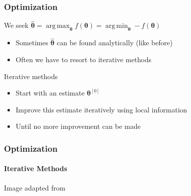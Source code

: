 \documentclass[xetex,professionalfont]{beamer}
\DeclareMathOperator*{\argmin}{arg\,min}
\DeclareMathOperator*{\argmax}{arg\,max}
\newcommand{\bth}{\boldsymbol{\theta}}
\begin{document}

\begin{frame}
\frametitle{Optimization}

We seek $\hat{\bth}=\argmax_{\bth} f(\bth)=\argmin_{\bth}-f(\bth)$ %
\begin{itemize}
    \item Sometimes $\hat{\bth}$ can be found analytically (like before) %
    \item Often we have to resort to iterative methods
\end{itemize}

\bigskip
Iterative methods
\begin{itemize}
    \item Start with an estimate $\bth^{[0]}$
    \item Improve this estimate iteratively using local information %
    \item Until no more improvement can be made
\end{itemize}

\end{frame}


\begin{frame}
\frametitle{Optimization}
\framesubtitle{Iterative Methods}

\begin{center}
    {\centering Image adapted from \cite{prince12}}
\end{center}

\end{frame}

\end{document}
